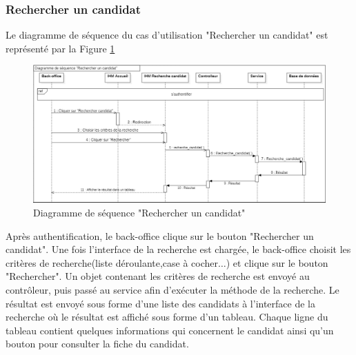 \subsubsection{Rechercher un candidat}
 Le diagramme de séquence du cas d'utilisation "Rechercher un candidat" est représenté par la Figure \ref{fig:sequence_recherche_candidat}
  \begin{figure}[H]
     \centering
     \includegraphics[scale=0.51]{img/sequence recherche candidat.png}
     \caption{Diagramme de séquence "Rechercher un candidat"}
     \label{fig:sequence_recherche_candidat}
 \end{figure}
 Après authentification, le back-office clique sur le bouton "Rechercher un candidat". Une fois l'interface de la recherche est chargée, le back-office choisit les critères de recherche(liste déroulante,case à cocher$\dots$) et clique sur le bouton "Rechercher". Un objet contenant les critères de recherche est envoyé au contrôleur, puis passé au service afin d'exécuter la méthode de la recherche. Le résultat est envoyé sous forme d'une liste des candidats à l'interface de la recherche où le résultat est affiché sous forme d'un tableau. Chaque ligne du tableau contient quelques informations qui concernent le candidat ainsi qu'un bouton pour consulter la fiche du candidat. 
